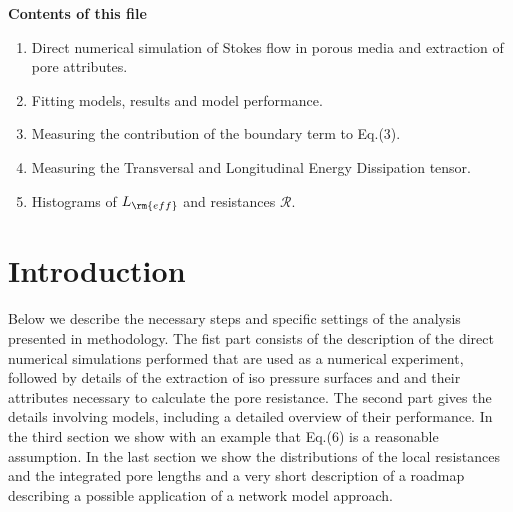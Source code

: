 \documentclass[draft,jgrga]{agutexSI2019}
\begin{document}
\begin{article}

%
%



\noindent\textbf{Contents of this file}
\begin{enumerate}
\item Direct numerical simulation of Stokes flow in porous media and extraction of pore attributes.
\item Fitting models, results and model performance.
\item Measuring the contribution of the boundary term to Eq.(3).
\item Measuring the Transversal and Longitudinal Energy Dissipation tensor.
\item Histograms of $L_{\rm{eff}}$ and resistances $\mathcal{R}$.
\end{enumerate}

\section*{Introduction}


Below we describe the necessary steps and specific settings of the analysis presented in methodology. The fist part consists of the description of the direct numerical simulations performed that are used as a numerical experiment, followed by details of the extraction of iso pressure surfaces and and their attributes necessary to calculate the pore resistance. The second part gives the details involving models, including a detailed overview of their performance. In the third section we show with an example that Eq.(6) is a reasonable assumption. In the last section we show the distributions of the local resistances and the integrated pore lengths and a very short description of a roadmap describing a possible application of a network model approach. 



\end{article}
\end{document}
